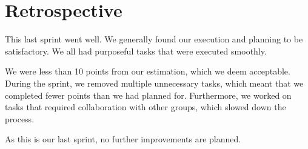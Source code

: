 \section{Retrospective}\label{sec:sprint6retrospective}
This last sprint went well. We generally found our execution and planning to be satisfactory. We all had purposeful tasks that were executed smoothly.

We were less than 10 points from our estimation, which we deem acceptable. During the sprint, we removed multiple unnecessary tasks, which meant that we completed fewer points than we had planned for. Furthermore, we worked on tasks that required collaboration with other groups, which slowed down the process.

As this is our last sprint, no further improvements are planned.